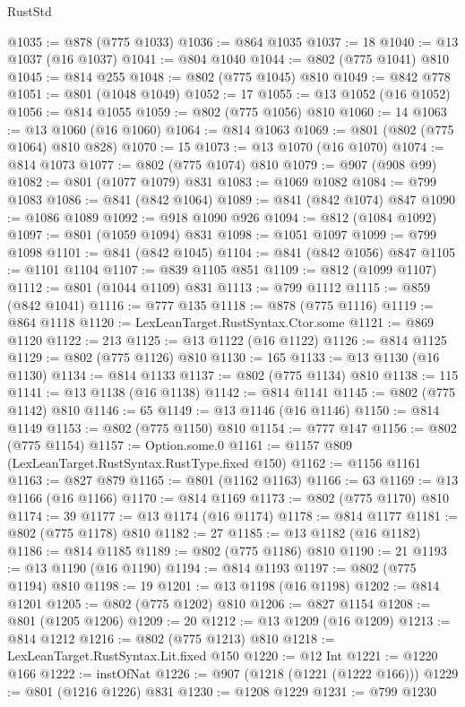 \begin{lexlean}{RustStd}
\begin{coremodule}
@1035 := @878 (@775 @1033)
@1036 := @864 @1035
@1037 := 18
@1040 := @13 @1037 (@16 @1037)
@1041 := @804 @1040
@1044 := @802 (@775 @1041) @810
@1045 := @814 @255
@1048 := @802 (@775 @1045) @810
@1049 := @842 @778
@1051 := @801 (@1048 @1049)
@1052 := 17
@1055 := @13 @1052 (@16 @1052)
@1056 := @814 @1055
@1059 := @802 (@775 @1056) @810
@1060 := 14
@1063 := @13 @1060 (@16 @1060)
@1064 := @814 @1063
@1069 := @801 (@802 (@775 @1064) @810 @828)
@1070 := 15
@1073 := @13 @1070 (@16 @1070)
@1074 := @814 @1073
@1077 := @802 (@775 @1074) @810
@1079 := @907 (@908 @99)
@1082 := @801 (@1077 @1079) @831
@1083 := @1069 @1082
@1084 := @799 @1083
@1086 := @841 (@842 @1064)
@1089 := @841 (@842 @1074) @847
@1090 := @1086 @1089
@1092 := @918 @1090 @926
@1094 := @812 (@1084 @1092)
@1097 := @801 (@1059 @1094) @831
@1098 := @1051 @1097
@1099 := @799 @1098
@1101 := @841 (@842 @1045)
@1104 := @841 (@842 @1056) @847
@1105 := @1101 @1104
@1107 := @839 @1105 @851
@1109 := @812 (@1099 @1107)
@1112 := @801 (@1044 @1109) @831
@1113 := @799 @1112
@1115 := @859 (@842 @1041)
@1116 := @777 @135
@1118 := @878 (@775 @1116)
@1119 := @864 @1118
@1120 := LexLeanTarget.RustSyntax.Ctor.some
@1121 := @869 @1120
@1122 := 213
@1125 := @13 @1122 (@16 @1122)
@1126 := @814 @1125
@1129 := @802 (@775 @1126) @810
@1130 := 165
@1133 := @13 @1130 (@16 @1130)
@1134 := @814 @1133
@1137 := @802 (@775 @1134) @810
@1138 := 115
@1141 := @13 @1138 (@16 @1138)
@1142 := @814 @1141
@1145 := @802 (@775 @1142) @810
@1146 := 65
@1149 := @13 @1146 (@16 @1146)
@1150 := @814 @1149
@1153 := @802 (@775 @1150) @810
@1154 := @777 @147
@1156 := @802 (@775 @1154)
@1157 := Option.some.{0}
@1161 := @1157 @809 (LexLeanTarget.RustSyntax.RustType.fixed @150)
@1162 := @1156 @1161
@1163 := @827 @879
@1165 := @801 (@1162 @1163)
@1166 := 63
@1169 := @13 @1166 (@16 @1166)
@1170 := @814 @1169
@1173 := @802 (@775 @1170) @810
@1174 := 39
@1177 := @13 @1174 (@16 @1174)
@1178 := @814 @1177
@1181 := @802 (@775 @1178) @810
@1182 := 27
@1185 := @13 @1182 (@16 @1182)
@1186 := @814 @1185
@1189 := @802 (@775 @1186) @810
@1190 := 21
@1193 := @13 @1190 (@16 @1190)
@1194 := @814 @1193
@1197 := @802 (@775 @1194) @810
@1198 := 19
@1201 := @13 @1198 (@16 @1198)
@1202 := @814 @1201
@1205 := @802 (@775 @1202) @810
@1206 := @827 @1154
@1208 := @801 (@1205 @1206)
@1209 := 20
@1212 := @13 @1209 (@16 @1209)
@1213 := @814 @1212
@1216 := @802 (@775 @1213) @810
@1218 := LexLeanTarget.RustSyntax.Lit.fixed @150
@1220 := @12 Int
@1221 := @1220 @166
@1222 := instOfNat
@1226 := @907 (@1218 (@1221 (@1222 @166)))
@1229 := @801 (@1216 @1226) @831
@1230 := @1208 @1229
@1231 := @799 @1230

\end{coremodule}
\end{lexlean}
